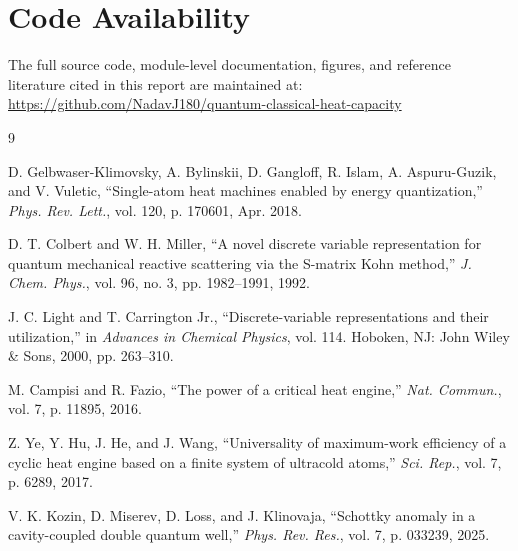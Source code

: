 \documentclass[10pt,conference]{IEEEtran}
\begin{document}
\section*{Code Availability}
The full source code, module-level documentation, figures, and reference literature cited in this report are maintained at:\\
\url{https://github.com/NadavJ180/quantum-classical-heat-capacity}

\begin{thebibliography}{9}

D. Gelbwaser-Klimovsky, A. Bylinskii, D. Gangloff, R. Islam, A. Aspuru-Guzik, and V. Vuletic, ``Single-atom heat machines enabled by energy quantization,'' \emph{Phys. Rev. Lett.}, vol. 120, p. 170601, Apr. 2018.

D. T. Colbert and W. H. Miller, ``A novel discrete variable representation for quantum mechanical reactive scattering via the S-matrix Kohn method,'' \emph{J. Chem. Phys.}, vol. 96, no. 3, pp. 1982--1991, 1992.

J. C. Light and T. Carrington Jr., ``Discrete-variable representations and their utilization,'' in \emph{Advances in Chemical Physics}, vol. 114. Hoboken, NJ: John Wiley \& Sons, 2000, pp. 263--310.

M. Campisi and R. Fazio, ``The power of a critical heat engine,'' \emph{Nat. Commun.}, vol. 7, p. 11895, 2016.

Z. Ye, Y. Hu, J. He, and J. Wang, ``Universality of maximum-work efficiency of a cyclic heat engine based on a finite system of ultracold atoms,'' \emph{Sci. Rep.}, vol. 7, p. 6289, 2017.

V. K. Kozin, D. Miserev, D. Loss, and J. Klinovaja, ``Schottky anomaly in a cavity-coupled double quantum well,'' \emph{Phys. Rev. Res.}, vol. 7, p. 033239, 2025.

\end{thebibliography}
\end{document}
